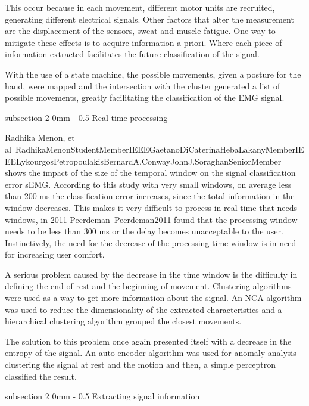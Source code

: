 \documentclass[a4paper, 12pt]{ppgeb}
\makeatletter
\renewcommand{\subsection}{\@startsection
{subsection}
{2}
{0mm}
{-\baselineskip}
{0.5\baselineskip}
{\bf\sffamily}}
\makeatother
\begin{document}
This occur because in each movement, different motor units are recruited, generating different electrical signals. Other factors that alter the measurement are the displacement of the sensors, sweat and muscle fatigue. One way to mitigate these effects is to acquire information a priori. Where each piece of information extracted facilitates the future classification of the signal.

With the use of a state machine, the possible movements, given a posture for the hand, were mapped and the intersection with the cluster generated a list of possible movements, greatly facilitating the classification of the EMG signal.

\subsection{Real-time processing}

Radhika Menon, et al~\cite{mainreferences}{RadhikaMenonStudentMemberIEEEGaetanoDiCaterinaHebaLakanyMemberIEEELykourgosPetropoulakisBernardA.ConwayJohnJ.SoraghanSeniorMember} shows the impact of the size of the temporal window on the signal classification error \ac{sEMG}. According to this study with very small windows, on average less than 200 ms the classification error increases, since the total information in the window decreases. This makes it very difficult to process in real time that needs windows, in 2011 Peerdeman~\cite{mainreferences}{Peerdeman2011} found that the processing window needs to be less than 300 ms or the delay becomes unacceptable to the user. Instinctively, the need for the decrease of the processing time window is in need for increasing user comfort.

A serious problem caused by the decrease in the time window is the difficulty in defining the end of rest and the beginning of movement. Clustering algorithms were used as a way to get more information about the signal. An \ac{NCA} algorithm was used to reduce the dimensionality of the extracted characteristics and a hierarchical clustering algorithm grouped the closest movements.

The solution to this problem once again presented itself with a decrease in the entropy of the signal. An auto-encoder algorithm was used for anomaly analysis clustering the signal at rest and the motion and then, a simple perceptron classified the result.

\subsection{Extracting signal information}
\end{document}
